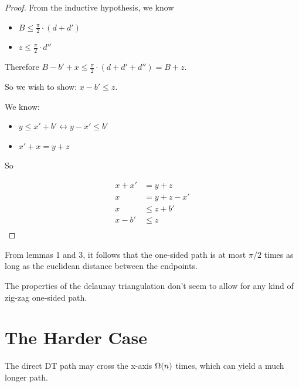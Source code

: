\documentclass{tufte-handout}
\begin{document}
\begin{proof}
From the inductive hypothesis, we know

\begin{itemize}

\item $B \le \frac{\pi}{2} \cdot (d + d')$

\item $z \le \frac{\pi}{2} \cdot d''$

\end{itemize}

Therefore $B - b' + x \le \frac{\pi}{2} \cdot (d + d' + d'') = B
+ z$.

So we wish to show: $x - b' \le z$.

We know:

\begin{itemize}

\item $y \le x' + b' \leftrightarrow y - x' \le b'$

\item $x' + x = y + z$

\end{itemize}

So

\begin{align*}
  x + x' &= y + z \\
  x &= y + z - x' \\
  x &\le z + b' \\
  x - b' &\le z \\
\end{align*}
  
\end{proof}

From lemmas 1 and 3, it follows that the one-sided path is at most
$\pi/2$ times as long as the euclidean distance between the endpoints.

The properties of the delaunay triangulation don't seem to allow for
any kind of zig-zag one-sided path.

\section{The Harder Case}

The direct DT path may cross the x-axis $\Omega\!\left(n\right)$ times,
which can yield a much longer path.
\end{document}
